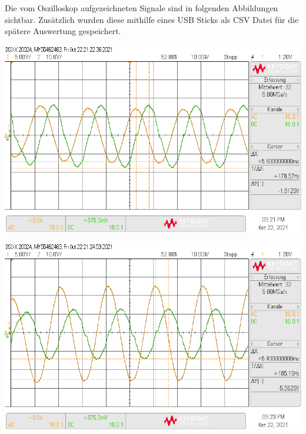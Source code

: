 \documentclass[11pt,ngerman]{scrartcl}
\begin{document}
Die vom Oszilloskop aufgezeichneten Signale sind in folgenden Abbildungen sichtbar. Zusätzlich wurden diese mithilfe eines USB Sticks als CSV Datei für die spätere Auswertung gespeichert.

\begin{minipage}{\textwidth}
	\begin{minipage}[t]{0.5\textwidth}
		\centering
		\includegraphics[width=\textwidth]{Phasenzeug/scope_1}
		\label{fig:oszi1_100}
	\end{minipage}
	\vspace{2mm}
	\begin{minipage}[t]{0.5\textwidth}
		\centering
		\includegraphics[width=\textwidth]{Phasenzeug/scope_2}
		\label{fig:oszi1_70}
	\end{minipage}
	\vspace{1em}
\end{minipage}
\end{document}

